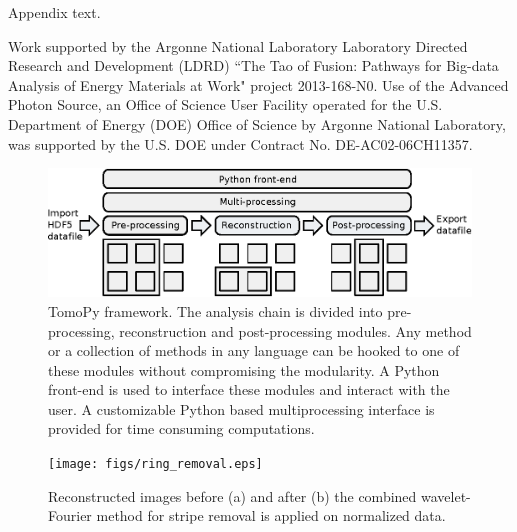 \documentclass[pdf]{iucr}              %
\begin{document}
Appendix text.



Work supported by the Argonne National Laboratory Laboratory Directed Research and Development (LDRD) ``The Tao of Fusion: Pathways for Big-data Analysis of Energy Materials at Work" project 2013-168-N0. Use of the Advanced Photon Source, an Office of Science User Facility operated for the U.S. Department of Energy (DOE) Office of Science by Argonne National Laboratory, was supported by the U.S. DOE under Contract No. DE-AC02-06CH11357. 





\begin{figure}
\centering
\includegraphics[width=\textwidth]{figs/framework.eps}
\caption{TomoPy framework. The analysis chain is divided into pre-processing, reconstruction and post-processing modules. Any method or a collection of methods in any language can be hooked to one of these modules without compromising the modularity. A Python front-end is used to interface these modules and interact with the user. A customizable Python based multiprocessing interface is provided for time consuming computations.}
\label{fig:Framework}
\end{figure}

\begin{figure}
\centering
\texttt{[image: figs/ring\_removal.eps]}
\caption{Reconstructed images before (a) and after (b) the combined wavelet-Fourier method for stripe removal is applied on normalized data.}
\label{fig:ProcessRing}
\end{figure}
\end{document}
